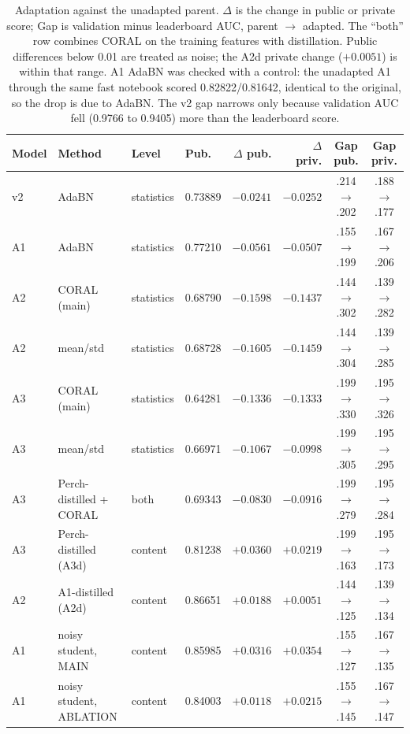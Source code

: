 \documentclass[letterpaper]{article} %
\begin{document}
\begin{table}[t]
\centering
\small
\begin{tabular}{llllrrcc}
\toprule
Model & Method & Level & Pub. & $\Delta$ pub. & $\Delta$ priv. & Gap pub. & Gap priv. \\
\midrule
v2 & AdaBN & statistics & 0.73889 & $-0.0241$ & $-0.0252$ & .214 $\to$ .202 & .188 $\to$ .177 \\
A1 & AdaBN & statistics & 0.77210 & $-0.0561$ & $-0.0507$ & .155 $\to$ .199 & .167 $\to$ .206 \\
A2 & CORAL (main) & statistics & 0.68790 & $-0.1598$ & $-0.1437$ & .144 $\to$ .302 & .139 $\to$ .282 \\
A2 & mean/std & statistics & 0.68728 & $-0.1605$ & $-0.1459$ & .144 $\to$ .304 & .139 $\to$ .285 \\
A3 & CORAL (main) & statistics & 0.64281 & $-0.1336$ & $-0.1333$ & .199 $\to$ .330 & .195 $\to$ .326 \\
A3 & mean/std & statistics & 0.66971 & $-0.1067$ & $-0.0998$ & .199 $\to$ .305 & .195 $\to$ .295 \\
A3 & Perch-distilled + CORAL & both & 0.69343 & $-0.0830$ & $-0.0916$ & .199 $\to$ .279 & .195 $\to$ .284 \\
\midrule
A3 & Perch-distilled (A3d) & content & 0.81238 & $+0.0360$ & $+0.0219$ & .199 $\to$ .163 & .195 $\to$ .173 \\
A2 & A1-distilled (A2d) & content & 0.86651 & $+0.0188$ & $+0.0051$ & .144 $\to$ .125 & .139 $\to$ .134 \\
A1 & noisy student, MAIN & content & 0.85985 & $+0.0316$ & $+0.0354$ & .155 $\to$ .127 & .167 $\to$ .135 \\
A1 & noisy student, ABLATION & content & 0.84003 & $+0.0118$ & $+0.0215$ & .155 $\to$ .145 & .167 $\to$ .147 \\
\bottomrule
\end{tabular}
\caption{Adaptation against the unadapted parent. $\Delta$ is the change in public or private score; Gap is validation minus leaderboard AUC, parent $\to$ adapted. The ``both'' row combines CORAL on the training features with distillation. Public differences below 0.01 are treated as noise; the A2d private change ($+0.0051$) is within that range. A1 AdaBN was checked with a control: the unadapted A1 through the same fast notebook scored 0.82822/0.81642, identical to the original, so the drop is due to AdaBN. The v2 gap narrows only because validation AUC fell (0.9766 to 0.9405) more than the leaderboard score.}
\label{tab:adapt}
\end{table}
\end{document}
